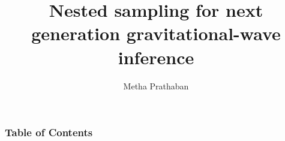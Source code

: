 \documentclass[aspectratio=169, 11pt]{beamer}
\title[Inference techniques in gravitational-wave science ] %
{Nested sampling for next generation gravitational-wave inference \\ \vspace{0.5em}
}
\author[Metha Prathaban] %
{Metha Prathaban} %
\date{}
\def \bblock{\begin{beamerboxesrounded}[upper=uppercolor,lower=lowercolor,shadow=true]}
\def \eblock{\end{beamerboxesrounded}}
\begin{document}
\frame{\titlepage}
\begin{frame}
\frametitle{Table of Contents}
\tableofcontents
\end{frame}
\end{document}
